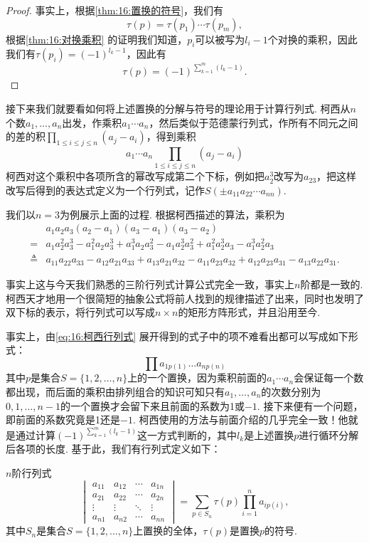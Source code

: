 \begin{proof}
    事实上，根据\autoref{thm:16:置换的符号}，我们有
    \[\tau(p)=\tau(p_1)\cdots\tau(p_m),\]
    根据\autoref{thm:16:对换乘积} 的证明我们知道，$p_i$可以被写为$l_i-1$个对换的乘积，因此我们有$\tau(p_i)=(-1)^{l_k-1}$，因此有
    \[\tau(p)=(-1)^{\sum\limits_{k=1}^m(l_k-1)}.\]
\end{proof}

接下来我们就要看如何将上述置换的分解与符号的理论用于计算行列式. 柯西从$n$个数$a_1,\ldots,a_n$出发，作乘积$a_1\cdots a_n$，然后类似于范德蒙行列式，作所有不同元之间的差的积$\displaystyle\prod_{1\leqslant i\leqslant j\leqslant n}(a_j-a_i)$，得到乘积
\begin{equation}\label{eq:16:柯西行列式}
    a_1\cdots a_n\prod_{1\leqslant i\leqslant j\leqslant n}(a_j-a_i)
\end{equation}
柯西对这个乘积中各项所含的幂改写成第二个下标，例如把$a_2^3$改写为$a_{23}$，把这样改写后得到的表达式定义为一个行列式，记作$S(\pm a_{11}a_{22}\cdots a_{nn})$.

我们以$n=3$为例展示上面的过程. 根据柯西描述的算法，乘积为
\begin{align*}
               & a_1a_2a_3(a_2-a_1)(a_3-a_1)(a_3-a_2)                                                                               \\
    =          & a_1a_2^2a_3^3-a_1^2a_2a_3^3+a_1^3a_2a_3^2-a_1a_2^3a_3^2+a_1^2a_2^3a_3-a_1^3a_2^2a_3                                \\
    \triangleq & a_{11}a_{22}a_{33}-a_{12}a_{21}a_{33}+a_{13}a_{21}a_{32}-a_{11}a_{23}a_{32}+a_{12}a_{23}a_{31}-a_{13}a_{22}a_{31}.
\end{align*}

事实上这与今天我们熟悉的三阶行列式计算公式完全一致，事实上$n$阶都是一致的. 柯西天才地用一个很简短的抽象公式将前人找到的规律描述了出来，同时也发明了双下标的表示，将行列式可以写成$n\times n$的矩形方阵形式，并且沿用至今.

事实上，由\autoref{eq:16:柯西行列式} 展开得到的式子中的项不难看出都可以写成如下形式：
\[\prod a_{1p(1)}\ldots a_{np(n)}\]
其中$p$是集合$S=\{1,2,\ldots,n\}$上的一个置换，因为乘积前面的$a_1\cdots a_n$会保证每一个数都出现，而后面的乘积由排列组合的知识可知只有$a_1,\ldots,a_n$的次数分别为$0,1,\ldots,n-1$的一个置换才会留下来且前面的系数为1或$-1$. 接下来便有一个问题，即前面的系数究竟是1还是$-1$. 柯西使用的方法与前面介绍的几乎完全一致！他就是通过计算$(-1)^{\sum\limits_{k=1}^m(l_k-1)}$这一方式判断的，其中$l_k$是上述置换$p$进行循环分解后各项的长度. 基于此，我们有行列式定义如下：
\begin{definition}
    $n$阶行列式
    \[\begin{vmatrix}
            a_{11} & a_{12} & \cdots & a_{1n} \\
            a_{21} & a_{22} & \cdots & a_{2n} \\
            \vdots & \vdots & \ddots & \vdots \\
            a_{n1} & a_{n2} & \cdots & a_{nn}
        \end{vmatrix}=\sum_{p\in S_n}\tau(p)\prod_{i=1}^na_{ip(i)},\]
    其中$S_n$是集合$S=\{1,2,\ldots,n\}$上置换的全体，$\tau(p)$是置换$p$的符号.
\end{definition}

